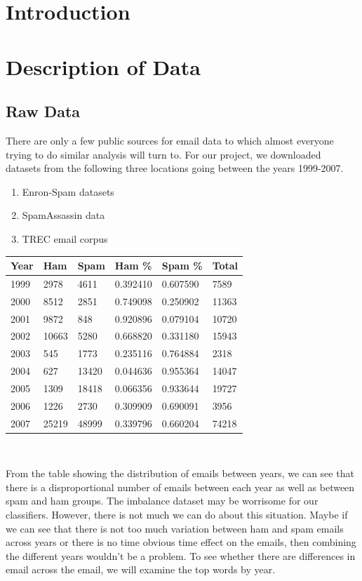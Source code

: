 \documentclass[12pt]{article}
\begin{document}
\section{Introduction} \label{sec:Intro}



\section{Description of Data} \label{sec:Descript}

\subsection{Raw Data}
\quad There are only a few public sources for email data to which almost everyone trying to do similar analysis will turn to. For our project, we downloaded datasets from the following three locations going between the years 1999-2007. 

\begin{enumerate}
\item Enron-Spam datasets
\item SpamAssassin data
\item TREC email corpus
\end{enumerate}

\begin{tabular}{l|l|l|l|l|l}
Year & 	Ham  & Spam & Ham \% & Spam \% & Total \\
\hline
1999 &	2978 &	4611 & 0.392410 &	0.607590 & 7589\\
2000 &	8512 &	2851 & 0.749098 &	0.250902 & 11363 \\
2001 & 	9872 &	848 & 0.920896 	& 0.079104 & 10720 \\
2002 &	10663 &	5280 & 0.668820 & 0.331180 & 15943 \\
2003 &	545 & 	1773 & 0.235116 &	0.764884 & 2318 \\
2004 &	627 &	13420 & 0.044636 &	0.955364 & 14047 \\
2005 &	1309 &	18418 & 0.066356 &	0.933644 & 19727 \\
2006 &	1226 &	2730 & 0.309909 &	0.690091 & 3956 \\
2007 &	25219 &	48999 & 0.339796 &	0.660204 & 74218 \\
\hline
\end{tabular}\\\vspace{.5cm}

From the table showing the distribution of emails between years, we can see that there is a disproportional number of emails between each year as well as between spam and ham groups. The imbalance dataset may be worrisome for our classifiers. However, there is not much we can do about this situation. Maybe if we can see that there is not too much variation between ham and spam emails across years or there is no time obvious time effect on the emails, then combining the different years wouldn't be a problem. To see whether there are differences in email across the email, we will examine the top words by year. 
\end{document}
